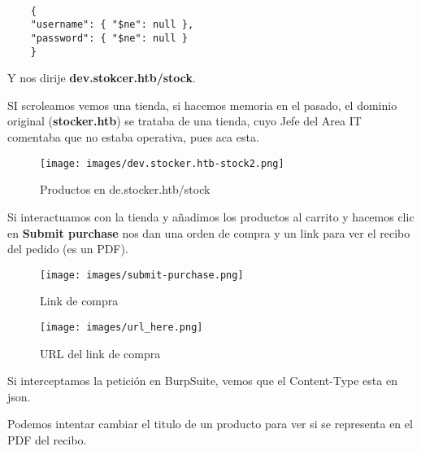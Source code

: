 \documentclass[a4paper]{article} %
\begin{document}
    \begin{lstlisting}[style=json, caption=Bypasseamos diciéndole que el username y el password no es null]
    
    {
    "username": { "$ne": null },
    "password": { "$ne": null }
    }
    \end{lstlisting}


    Y nos dirije \textbf{dev.stokcer.htb/stock}.

    SI scroleamos vemos una tienda, si hacemos memoria en el pasado, el dominio original (\textbf{stocker.htb}) se trataba de una tienda, cuyo Jefe del Area IT comentaba que no estaba operativa, pues aca esta.

    \begin{figure}[h] %
        \centering
        \texttt{[image: images/dev.stocker.htb-stock2.png]}
        \caption{Productos en de.stocker.htb/stock} %
    \end{figure}\par\vspace{5cm}

    Si interactuamos con la tienda y añadimos los productos al carrito y hacemos clic en {\textbf{\color{blue}Submit purchase}} nos dan una orden de compra y un link para ver el recibo del pedido (es un PDF).

    \begin{figure}[h] %
        \centering
        \texttt{[image: images/submit-purchase.png]}
        \caption{Link de compra} %
    \end{figure}\par\vspace{2cm}

    \begin{figure}[h] %
        \centering
        \texttt{[image: images/url\_here.png]}
        \caption{URL del link de compra} %
    \end{figure}\par\vspace{1cm}

    Si interceptamos la petición en BurpSuite, vemos que el Content-Type esta en json. 
    
    Podemos intentar cambiar el titulo de un producto para ver si se representa en el PDF del recibo.
\end{document}
